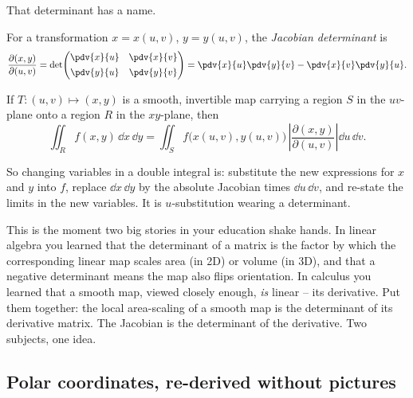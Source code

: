 That determinant has a name.

\begin{definition}[Jacobian]
\label{ch34:def-jacobian}
For a transformation $x=x(u,v)$, $y=y(u,v)$, the \emph{Jacobian determinant} is
\[
  \frac{\partial(x,y)}{\partial(u,v)}
  =\det\!\begin{pmatrix}\pdv{x}{u} & \pdv{x}{v}\\[4pt]
                        \pdv{y}{u} & \pdv{y}{v}\end{pmatrix}
  =\pdv{x}{u}\pdv{y}{v}-\pdv{x}{v}\pdv{y}{u}.
\]
\end{definition}

\begin{theorem}
\label{ch34:thm-cov}
If $T:(u,v)\mapsto(x,y)$ is a smooth, invertible map carrying a region $S$ in the
$uv$-plane onto a region $R$ in the $xy$-plane, then
\[
  \iint_R f(x,y)\,\dd x\,\dd y
  =\iint_S f\big(x(u,v),y(u,v)\big)\,
     \left|\frac{\partial(x,y)}{\partial(u,v)}\right|\dd u\,\dd v .
\]
\end{theorem}

So changing variables in a double integral is: substitute the new expressions for
$x$ and $y$ into $f$, replace $\dd x\,\dd y$ by the absolute Jacobian times
$\dd u\,\dd v$, and re-state the limits in the new variables. It is
$u$-substitution wearing a determinant.

\begin{connectionbox}
This is the moment two big stories in your education shake hands. In linear
algebra you learned that the determinant of a matrix is the factor by which the
corresponding linear map scales area (in 2D) or volume (in 3D), and that a
negative determinant means the map also flips orientation. In calculus you
learned that a smooth map, viewed closely enough, \emph{is} linear -- its
derivative. Put them together: the local area-scaling of a smooth map is the
determinant of its derivative matrix. The Jacobian is the determinant of the
derivative. Two subjects, one idea.
\end{connectionbox}

\subsection{Polar coordinates, re-derived without pictures}

